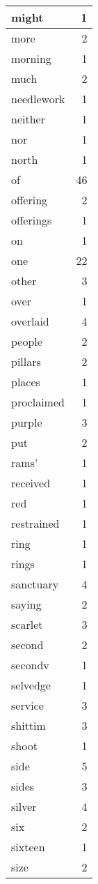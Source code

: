 \begin{center}
\begin{longtable}{l|r}
might & 1 \\ \hline
more & 2 \\ \hline
morning & 1 \\ \hline
much & 2 \\ \hline
needlework & 1 \\ \hline
neither & 1 \\ \hline
nor & 1 \\ \hline
north & 1 \\ \hline
of & 46 \\ \hline
offering & 2 \\ \hline
offerings & 1 \\ \hline
on & 1 \\ \hline
one & 22 \\ \hline
other & 3 \\ \hline
over & 1 \\ \hline
overlaid & 4 \\ \hline
people & 2 \\ \hline
pillars & 2 \\ \hline
places & 1 \\ \hline
proclaimed & 1 \\ \hline
purple & 3 \\ \hline
put & 2 \\ \hline
rams' & 1 \\ \hline
received & 1 \\ \hline
red & 1 \\ \hline
restrained & 1 \\ \hline
ring & 1 \\ \hline
rings & 1 \\ \hline
sanctuary & 4 \\ \hline
saying & 2 \\ \hline
scarlet & 3 \\ \hline
second & 2 \\ \hline
secondv & 1 \\ \hline
selvedge & 1 \\ \hline
service & 3 \\ \hline
shittim & 3 \\ \hline
shoot & 1 \\ \hline
side & 5 \\ \hline
sides & 3 \\ \hline
silver & 4 \\ \hline
six & 2 \\ \hline
sixteen & 1 \\ \hline
size & 2 \\ \hline

\end{longtable}
\end{center}
